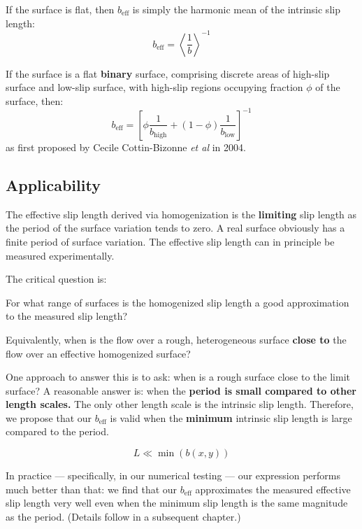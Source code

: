 \documentclass[a4paper]{report}
\newcommand{\beff}{\ensuremath{b_{\mathrm{eff}}}}
\begin{document}
If the surface is flat, then $\beff$ is simply the harmonic mean of the intrinsic slip length:
\begin{equation}
\beff = \left< \frac{1}{b} \right> ^{-1}
\end{equation}

If the surface is a flat \textbf{binary} surface, comprising discrete areas of high-slip surface and low-slip surface, with high-slip regions occupying fraction $\phi$ of the surface, then:
\begin{equation}
\beff = \left[ \phi \frac{1}{ b_{\mathrm{high}} }  + (1 -\phi) \frac{1}{ b_{\mathrm{low}}} \right]^{-1}
\end{equation}
as first proposed by Cecile Cottin-Bizonne \emph{et al} in 2004.


\subsection*{Applicability}

The effective slip length derived via homogenization is the \textbf{limiting} slip length as the period of the surface variation tends to zero.  A real surface obviously has a finite period of surface variation.  The effective slip length can in principle be measured experimentally.  

The critical question is:

\vspace{1em}
For what range of surfaces is the homogenized slip length a good approximation to the measured slip length?

\vspace{1em}
Equivalently, when is the flow over a rough, heterogeneous surface \textbf{close to} the flow over an effective homogenized surface?  

One approach to answer this is to ask: when is a rough surface close to the limit surface?  A reasonable answer is: when the \textbf{period is small compared to other length scales.}
The only other length scale is the intrinsic slip length.  Therefore, we propose that our $\beff$ is valid when the \textbf{minimum} intrinsic slip length is large compared to the period.

\begin{equation}
L \ll \min(b(x,y))
\end{equation}

In practice --- specifically, in our numerical testing --- our expression performs much better than that: we find that our $\beff$ approximates the measured effective slip length very well even when the minimum slip length is the same magnitude as the period.
(Details follow in a subsequent chapter.)







\end{document}
